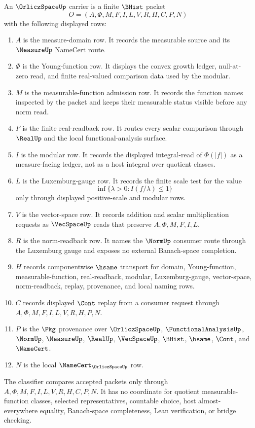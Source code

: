 \begin{definition}
\label{def:orlicz-space-carrier}
An $\OrliczSpaceUp$ carrier is a finite $\BHist$ packet
$$
O=(A,\Phi,M,F,I,L,V,R,H,C,P,N)
$$
with the following displayed rows:
\begin{enumerate}
\item $A$ is the measure-domain row. It records the measurable source and its $\MeasureUp$ NameCert route.
\item $\Phi$ is the Young-function row. It displays the convex growth ledger, null-at-zero read, and finite real-valued comparison data used by the modular.
\item $M$ is the measurable-function admission row. It records the function names inspected by the packet and keeps their measurable status visible before any norm read.
\item $F$ is the finite real-readback row. It routes every scalar comparison through $\RealUp$ and the local functional-analysis surface.
\item $I$ is the modular row. It records the displayed integral-read of $\Phi(|f|)$ as a measure-facing ledger, not as a host integral over quotient classes.
\item $L$ is the Luxemburg-gauge row. It records the finite scale test for the value
$$
\inf\{\lambda>0 : I(f/\lambda)\leq 1\}
$$
only through displayed positive-scale and modular rows.
\item $V$ is the vector-space row. It records addition and scalar multiplication requests as $\VecSpaceUp$ reads that preserve $A,\Phi,M,F,I,L$.
\item $R$ is the norm-readback row. It names the $\NormUp$ consumer route through the Luxemburg gauge and exposes no external Banach-space completion.
\item $H$ records componentwise $\hsame$ transport for domain, Young-function, measurable-function, real-readback, modular, Luxemburg-gauge, vector-space, norm-readback, replay, provenance, and local naming rows.
\item $C$ records displayed $\Cont$ replay from a consumer request through $A,\Phi,M,F,I,L,V,R,H,P,N$.
\item $P$ is the $\Pkg$ provenance over $\OrliczSpaceUp$, $\FunctionalAnalysisUp$, $\NormUp$, $\MeasureUp$, $\RealUp$, $\VecSpaceUp$, $\BHist$, $\hsame$, $\Cont$, and $\NameCert$.
\item $N$ is the local $\NameCert_{\OrliczSpaceUp}$ row.
\end{enumerate}
The classifier compares accepted packets only through $A,\Phi,M,F,I,L,V,R,H,C,P,N$. It has no coordinate for quotient measurable-function classes, selected representatives, countable choice, host almost-everywhere equality, Banach-space completeness, Lean verification, or bridge checking.
\end{definition}

